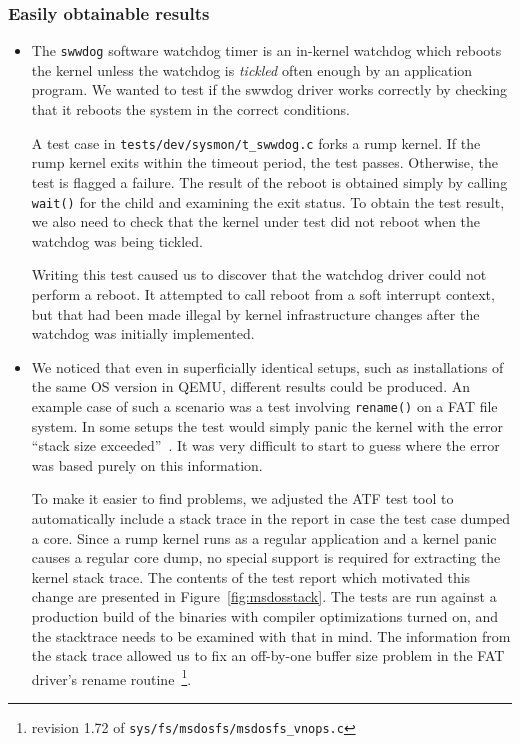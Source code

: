 \subsubsection*{Easily obtainable results}

\begin{itemize}
\item   The \texttt{swwdog} software watchdog timer is an in-kernel
	watchdog which reboots the kernel unless the watchdog is
	\textit{tickled} often enough by an application program.
	We wanted to test if the swwdog driver works correctly by
	checking that it reboots the system in the correct
	conditions.

	A test case in \verb+tests/dev/sysmon/t_swwdog.c+ forks a
	rump kernel.  If the rump kernel exits within the timeout
	period, the test passes.  Otherwise, the test is flagged
	a failure.  The result of the reboot is obtained simply
	by calling \texttt{wait()} for the child
	and examining the exit status.  To obtain the test result,
	we also need to check that the kernel under test did not
	reboot when the watchdog was being tickled.

	Writing this test caused us to discover that the watchdog
	driver could not perform a reboot.  It attempted to call reboot
	from a soft interrupt context, but that had been made
	illegal by kernel infrastructure changes after the watchdog
	was initially implemented.

\item   We noticed that even in superficially identical
	setups, such as installations of the same OS version in
	QEMU, different results could be produced.  An example case
	of such a scenario was a test involving
	\texttt{rename()} on a FAT file system.  In some setups
	the test would simply panic the kernel with the error
	``stack size exceeded''~\cite{gson:build}.  It was very
	difficult to start to guess where the error was based purely
	on this information.

	To make it easier to find problems, we adjusted the
	ATF test tool to automatically include a stack trace in
	the report in case the test case dumped a core.  Since a
	rump kernel runs as a regular application and a kernel
	panic causes a regular core dump, no special support is
	required for extracting the kernel stack trace.  The contents
	of the test report which motivated this change are presented
	in Figure~\ref{fig:msdosstack}.  The tests are run against a
	production build of the binaries with compiler optimizations
	turned on, and the stacktrace needs to be examined with that in
	mind.  The information from the stack trace allowed us to fix an off-by-one
	buffer size problem in the FAT driver's rename routine~\footnote
{
	revision 1.72 of \texttt{sys/fs/msdosfs/msdosfs\_vnops.c}
}.

\end{itemize}

